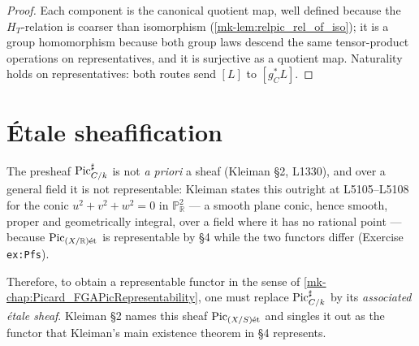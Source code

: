 \begin{proof}
  \leanok{}
  Each component is the canonical quotient map, well defined because the
  \(H_T\)-relation is coarser than isomorphism
  (\ref{mk-lem:relpic_rel_of_iso}); it is a group homomorphism because both
  group laws descend the same tensor-product operations on representatives,
  and it is surjective as a quotient map. Naturality holds on
  representatives: both routes send \([L]\) to \([g_C^* L]\).
\end{proof}

\section{\'Etale sheafification}
\label{mk-sec:relpic_etale_sheaf}

The presheaf \(\operatorname{Pic}^\sharp_{C/k}\) is not \emph{a priori} a sheaf (Kleiman
\S 2, L1330), and over a general field it is not representable: Kleiman states
this outright at L5105--L5108 for the conic \(u^2+v^2+w^2=0\) in
\(\mathbb{P}^2_{\mathbb{R}}\) --- a smooth plane conic, hence smooth, proper and
geometrically integral, over a field where it has no rational point ---
because \(\operatorname{Pic}_{(X/\mathbb{R})\mathrm{\acute{e}t}}\) is representable by \S 4 while the two
functors differ (Exercise \texttt{ex:Pfs}).

Therefore, to obtain a representable functor in the sense of
\ref{mk-chap:Picard_FGAPicRepresentability}, one must replace
\(\operatorname{Pic}^\sharp_{C/k}\) by its \emph{associated \'etale sheaf}. Kleiman \S 2 names
this sheaf \(\operatorname{Pic}_{(X/S)\mathrm{\acute{e}t}}\) and singles it out as the functor that Kleiman's
main existence theorem in \S 4 represents.

